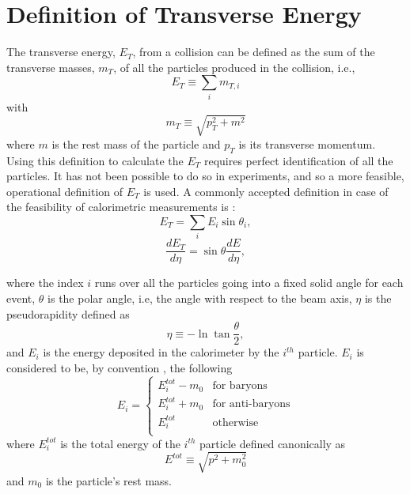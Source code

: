 \section{Definition of Transverse Energy}
The transverse energy, $E_{T}$, from a collision can be defined as the sum of the transverse masses, $m_{T}$, of all the particles produced in the collision, i.e.,
\begin{equation}\label{eqn:ETDefTheory}
E_{T}\equiv\sum_{i}m_{T,i}
\end{equation}
with
\begin{equation}\label{eqn:mT}
m_{T}\equiv\sqrt{p_{T}^{2}+m^2}
\end{equation}
where $m$ is the rest mass of the particle and $p_{T}$ is its transverse momentum. Using this definition to calculate the $E_{T}$ requires perfect identification of all the particles. It has not been possible to do so in experiments, and so a more feasible, operational definition of $E_{T}$ is used. A commonly accepted definition in case of the feasibility of calorimetric measurements is \cite{PhysRevC.89.044905, PhysRevLett.109.152303}:
\begin{equation}\label{eqn:ETDefSum}
E_{T} = \sum_{i}E_{i}\sin{\theta_{i}},
\end{equation}
\begin{equation}\label{eqn:dETdEta}
\frac{dE_{T}}{d\eta}=\sin{\theta}\frac{dE}{d\eta},
\end{equation}

where the index $i$ runs over all the particles going into a fixed solid angle for each event, $\theta$ is the polar angle, i.e, the angle with respect to the beam axis, $\eta$ is the pseudorapidity defined as 
\begin{equation}\label{eqn:pseudorap}
\eta\equiv-\ln\tan{\frac{\theta}{2}},
\end{equation}
and $E_{i}$ is the energy deposited in the calorimeter by the $i^{th}$ particle. $E_{i}$ is considered to be, by convention \cite{PhysRevC.71.034908}, the following
\begin{equation}\label{eqn:EiCaseByCase}
E_{i} = 
	\begin{cases}
	E_{i}^{tot}-m_{0} & \text{for baryons} \\
	E_{i}^{tot}+m_{0} & \text{for anti-baryons} \\	
	E_{i}^{tot} & \text{otherwise} \\
	\end{cases}
\end{equation}
where $E_{i}^{tot}$ is the total energy of the $i^{th}$ particle defined canonically as
\begin{equation}\label{eqn:Etot}
E^{tot}\equiv\sqrt{p^{2}+m_{0}^2}
\end{equation}
and  $m_{0}$ is the particle's rest mass.

